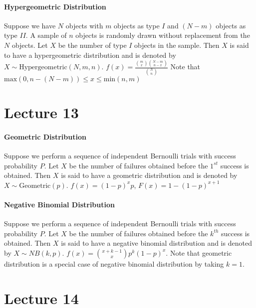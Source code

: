 \documentclass[10pt,letter]{article}
\begin{document}
\paragraph{Hypergeometric Distribution}
Suppose we have $N$ objects with $m$ objects as type $I$ and $(N-m)$ objects as type $II$. A sample of $n$ objects is randomly drawn without replacement from the $N$ objects. Let $X$ be the number of type $I$ objects in the sample. Then $X$ is said to have a hypergeometric distribution and is denoted by $X\sim \text{Hypergeometric}(N,m,n)$. $f(x)=\frac{{m\choose x}{N-m\choose n-x}}{{N\choose n}}$ Note that $\text{max}(0,n-(N-m))\leq x\leq \text{min}(n,m)$

\section*{Lecture 13}
\paragraph{Geometric Distribution}
Suppose we perform a sequence of independent Bernoulli trials with success probability $P$. Let $X$ be the number of failures obtained before the $1^{st}$ success is obtained. Then $X$ is said to have a geometric distribution and is denoted by $X\sim\text{Geometric}(p)$. $f(x)=(1-p)^xp$, $F(x)=1-(1-p)^{x+1}$

\paragraph{Negative Binomial Distribution}
Suppose we perform a sequence of independent Bernoulli trials with success probability $P$. Let $X$ be the number of failures obtained before the $k^{th}$ success is obtained. Then $X$ is said to have a negative binomial distribution and is denoted by $X\sim NB(k,p)$. $f(x)={x+k-1\choose x}p^k(1-p)^x$. Note that geometric distribution is a special case of negative binomial distribution by taking $k=1$. 

\section*{Lecture 14}
\end{document}
